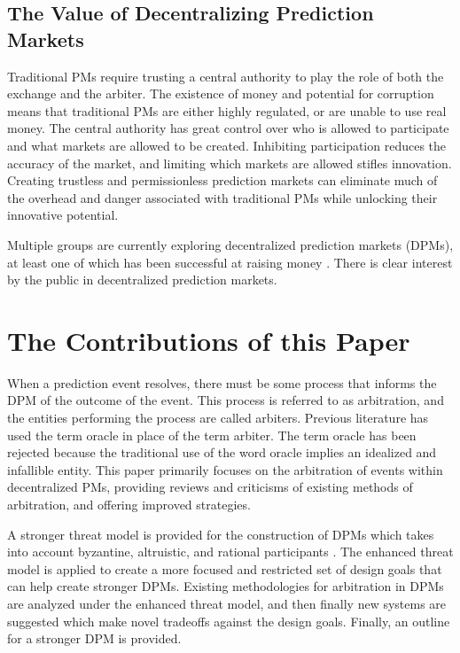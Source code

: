 \documentclass[onecolumn]{article}
\begin{document}
\subsection{The Value of Decentralizing Prediction Markets}
Traditional PMs require trusting a central authority to play the role of both the exchange and the arbiter.
The existence of money and potential for corruption means that traditional PMs are either highly regulated, or are unable to use real money.
The central authority has great control over who is allowed to participate and what markets are allowed to be created.
Inhibiting participation reduces the accuracy of the market, and limiting which markets are allowed stifles innovation.
Creating trustless and permissionless prediction markets can eliminate much of the overhead and danger associated with traditional PMs while unlocking their innovative potential.

Multiple groups are currently exploring decentralized prediction markets (DPMs), at least one of which has been successful at raising money \cite{augsale}.
There is clear interest by the public in decentralized prediction markets.

\section{The Contributions of this Paper}
When a prediction event resolves, there must be some process that informs the DPM of the outcome of the event.
This process is referred to as arbitration, and the entities performing the process are called arbiters.
Previous literature \cite{augur} \cite{truthcoin} has used the term oracle in place of the term arbiter.
The term oracle has been rejected because the traditional use of the word oracle implies an idealized and infallible entity.
This paper primarily focuses on the arbitration of events within decentralized PMs, providing reviews and criticisms of existing methods of arbitration, and offering improved strategies.

A stronger threat model is provided for the construction of DPMs which takes into account byzantine, altruistic, and rational participants \cite{bar}.
The enhanced threat model is applied to create a more focused and restricted set of design goals that can help create stronger DPMs.
Existing methodologies for arbitration in DPMs are analyzed under the enhanced threat model, and then finally new systems are suggested which make novel tradeoffs against the design goals.
Finally, an outline for a stronger DPM is provided.
\end{document}
